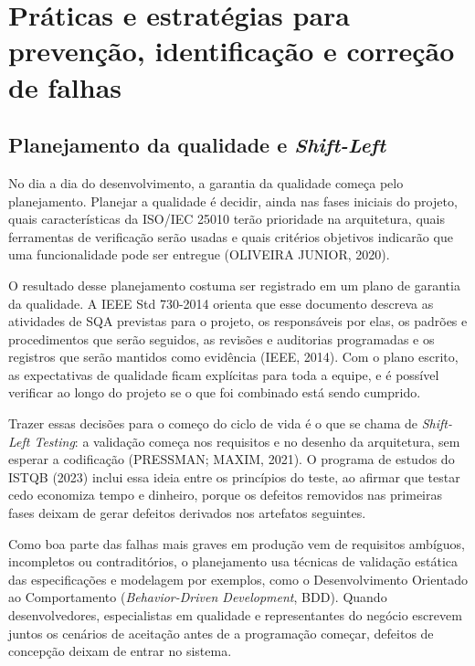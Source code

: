 \documentclass[12pt,a4paper]{article}
\begin{document}
\section{Práticas e estratégias para prevenção, identificação e correção de falhas}
\label{sec:praticas}

\subsection{Planejamento da qualidade e \textit{Shift-Left}}
\label{sec:planejamento}

No dia a dia do desenvolvimento, a garantia da qualidade começa pelo planejamento. Planejar a qualidade é decidir, ainda nas fases iniciais do projeto, quais características da ISO/IEC 25010 terão prioridade na arquitetura, quais ferramentas de verificação serão usadas e quais critérios objetivos indicarão que uma funcionalidade pode ser entregue (OLIVEIRA JUNIOR, 2020).

O resultado desse planejamento costuma ser registrado em um plano de garantia da qualidade. A IEEE Std 730-2014 orienta que esse documento descreva as atividades de SQA previstas para o projeto, os responsáveis por elas, os padrões e procedimentos que serão seguidos, as revisões e auditorias programadas e os registros que serão mantidos como evidência (IEEE, 2014). Com o plano escrito, as expectativas de qualidade ficam explícitas para toda a equipe, e é possível verificar ao longo do projeto se o que foi combinado está sendo cumprido.

Trazer essas decisões para o começo do ciclo de vida é o que se chama de \textit{Shift-Left Testing}: a validação começa nos requisitos e no desenho da arquitetura, sem esperar a codificação (PRESSMAN; MAXIM, 2021). O programa de estudos do ISTQB (2023) inclui essa ideia entre os princípios do teste, ao afirmar que testar cedo economiza tempo e dinheiro, porque os defeitos removidos nas primeiras fases deixam de gerar defeitos derivados nos artefatos seguintes.

Como boa parte das falhas mais graves em produção vem de requisitos ambíguos, incompletos ou contraditórios, o planejamento usa técnicas de validação estática das especificações e modelagem por exemplos, como o Desenvolvimento Orientado ao Comportamento (\textit{Behavior-Driven Development}, BDD). Quando desenvolvedores, especialistas em qualidade e representantes do negócio escrevem juntos os cenários de aceitação antes de a programação começar, defeitos de concepção deixam de entrar no sistema.
\end{document}
